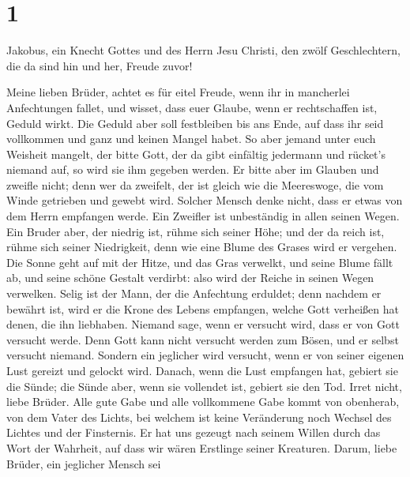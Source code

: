 \hypertarget{section}{%
\section{1}\label{section}}

 Jakobus, ein Knecht Gottes und des Herrn Jesu Christi,
den zwölf Geschlechtern, die da sind hin und her, Freude zuvor!

 Meine lieben Brüder, achtet es für eitel Freude, wenn ihr
in mancherlei Anfechtungen fallet,  und wisset, dass euer
Glaube, wenn er rechtschaffen ist, Geduld wirkt.  Die
Geduld aber soll festbleiben bis ans Ende, auf dass ihr seid vollkommen
und ganz und keinen Mangel habet.  So aber jemand unter
euch Weisheit mangelt, der bitte Gott, der da gibt einfältig jedermann
und rücket's niemand auf, so wird sie ihm gegeben werden. 
Er bitte aber im Glauben und zweifle nicht; denn wer da zweifelt, der
ist gleich wie die Meereswoge, die vom Winde getrieben und gewebt wird.
 Solcher Mensch denke nicht, dass er etwas von dem Herrn
empfangen werde.  Ein Zweifler ist unbeständig in allen
seinen Wegen.  Ein Bruder aber, der niedrig ist, rühme
sich seiner Höhe;  und der da reich ist, rühme sich
seiner Niedrigkeit, denn wie eine Blume des Grases wird er vergehen.
 Die Sonne geht auf mit der Hitze, und das Gras verwelkt,
und seine Blume fällt ab, und seine schöne Gestalt verdirbt: also wird
der Reiche in seinen Wegen verwelken.  Selig ist der
Mann, der die Anfechtung erduldet; denn nachdem er bewährt ist, wird er
die Krone des Lebens empfangen, welche Gott verheißen hat denen, die ihn
liebhaben.  Niemand sage, wenn er versucht wird, dass er
von Gott versucht werde. Denn Gott kann nicht versucht werden zum Bösen,
und er selbst versucht niemand.  Sondern ein jeglicher
wird versucht, wenn er von seiner eigenen Lust gereizt und gelockt wird.
 Danach, wenn die Lust empfangen hat, gebiert sie die
Sünde; die Sünde aber, wenn sie vollendet ist, gebiert sie den Tod.
 Irret nicht, liebe Brüder.  Alle gute
Gabe und alle vollkommene Gabe kommt von obenherab, von dem Vater des
Lichts, bei welchem ist keine Veränderung noch Wechsel des Lichtes und
der Finsternis.  Er hat uns gezeugt nach seinem Willen
durch das Wort der Wahrheit, auf dass wir wären Erstlinge seiner
Kreaturen.  Darum, liebe Brüder, ein jeglicher Mensch sei
